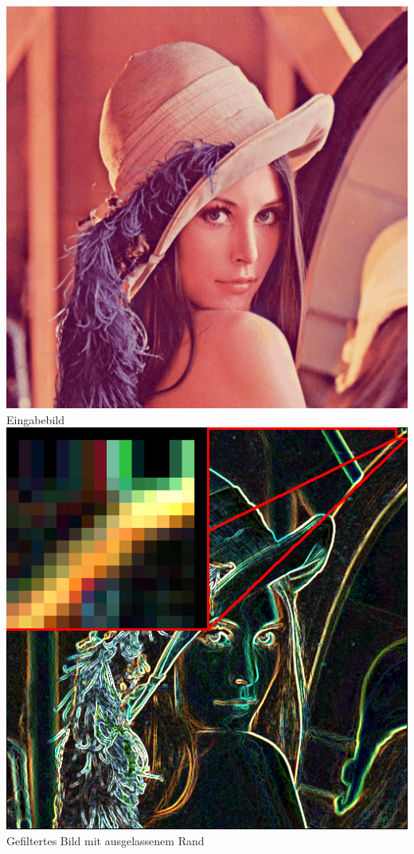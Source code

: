 \documentclass[course=asp]{aspdoc}
\begin{document}
\includegraphics[scale=0.25]{resources/lena}\quad Eingabebild\\[1ex]
\includegraphics[scale=0.25]{resources/lenaEBig}\quad Gefiltertes Bild mit ausgelassenem Rand\\[1ex]
\end{document}
